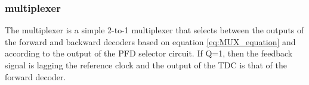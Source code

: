 \subsubsection{multiplexer}
The multiplexer is a simple 2-to-1 multiplexer that selects between the outputs of the forward and backward decoders based on equation \ref{eq:MUX_equation} and according to the output of the PFD selector circuit.
If Q=1, then the feedback signal is lagging the reference clock and the output of the TDC is that of the forward decoder.                                                                                                                                                                                                                                                                                                                                                                                                                                                                                                                                                                                                                                                                                                                                                                                                                                                                                                                                                                                                                                                                                                                                                                                                                                                                                                                                                                                                                                                                                                                                                                                                                                                                                                                                                                                                                                                                                                                                                                                                                                                                                                                                                                                                                                                                                                                                                                                                                                                                                                                                                                                                                                                                                                                                                                                                                                                                             
